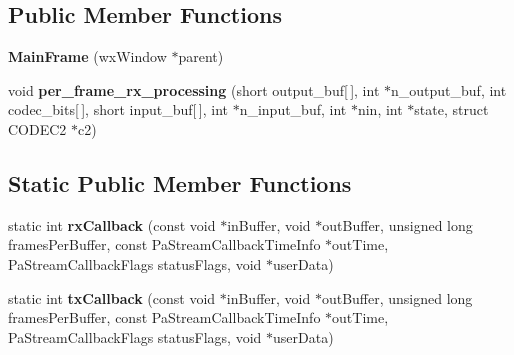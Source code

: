 \subsection*{Public Member Functions}
\begin{DoxyCompactItemize}
\item 
\hypertarget{class_main_frame_a394b51dbf31b7430ecad3f6ee1007e22}{{\bfseries Main\-Frame} (wx\-Window $\ast$parent)}\label{class_main_frame_a394b51dbf31b7430ecad3f6ee1007e22}

\item 
\hypertarget{class_main_frame_af9f4cfb8469872efd9c057d1bc215f08}{void {\bfseries per\-\_\-frame\-\_\-rx\-\_\-processing} (short output\-\_\-buf\mbox{[}$\,$\mbox{]}, int $\ast$n\-\_\-output\-\_\-buf, int codec\-\_\-bits\mbox{[}$\,$\mbox{]}, short input\-\_\-buf\mbox{[}$\,$\mbox{]}, int $\ast$n\-\_\-input\-\_\-buf, int $\ast$nin, int $\ast$state, struct C\-O\-D\-E\-C2 $\ast$c2)}\label{class_main_frame_af9f4cfb8469872efd9c057d1bc215f08}

\end{DoxyCompactItemize}
\subsection*{Static Public Member Functions}
\begin{DoxyCompactItemize}
\item 
\hypertarget{class_main_frame_a45e054e7f42f10088a699821a169d295}{static int {\bfseries rx\-Callback} (const void $\ast$in\-Buffer, void $\ast$out\-Buffer, unsigned long frames\-Per\-Buffer, const Pa\-Stream\-Callback\-Time\-Info $\ast$out\-Time, Pa\-Stream\-Callback\-Flags status\-Flags, void $\ast$user\-Data)}\label{class_main_frame_a45e054e7f42f10088a699821a169d295}

\item 
\hypertarget{class_main_frame_afca7a385e843876355c50833e5ea4edb}{static int {\bfseries tx\-Callback} (const void $\ast$in\-Buffer, void $\ast$out\-Buffer, unsigned long frames\-Per\-Buffer, const Pa\-Stream\-Callback\-Time\-Info $\ast$out\-Time, Pa\-Stream\-Callback\-Flags status\-Flags, void $\ast$user\-Data)}\label{class_main_frame_afca7a385e843876355c50833e5ea4edb}

\end{DoxyCompactItemize}
